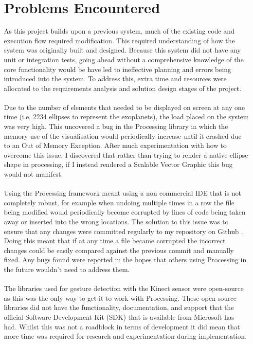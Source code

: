 \section{Problems Encountered}

As this project builds upon a previous system, much of the existing code and
execution flow required modification. This required understanding of how the
system was originally built and designed. Because this system did not have any
unit or integration tests, going ahead without a comprehensive knowledge of the
core functionality would be have led to ineffective planning and errors being
introduced into the system. To address this, extra time and resources were
allocated to the requirements analysis and solution design stages of the
project.
\\\\
Due to the number of elements that needed to be displayed on screen at any one
time (i.e. 2234 ellipses to represent the exoplanets), the load placed on the
system was very high. This uncovered a bug in
the Processing library in which the memory use of the visualisation would
periodically increase until it crashed due to an Out of Memory Exception. After
much experimentation with how to overcome this issue, I discovered that rather
than trying to render a native ellipse shape in processing, if I instead
rendered
a Scalable Vector Graphic this bug would not manifest. 
\\\\
Using the Processing framework meant using a non commercial IDE that is not
completely robust, for example when undoing multiple times in a row the file
being
modified would periodically become corrupted by lines of code being taken away
or inserted into the wrong locations. The solution to this issue was to ensure
that any changes were committed regularly to my repository on Github
\cite{github}. Doing this meant that if at any time a file became corrupted the
incorrect changes could be easily compared against the previous commit and
manually fixed. Any bugs found were reported in
the hopes that others using Processing in the future wouldn't need to address
them.
\\\\
The libraries used for gesture detection with the Kinect sensor were open-source
as this was the only way to get it to work with Processing. These open source
libraries did not have the functionality, documentation, and support that the
official Software Development Kit (SDK) that is available from Microsoft has
had. Whilst this was not a roadblock in terms of development it did mean that
more time was required for research and experimentation during implementation.
\\\\

